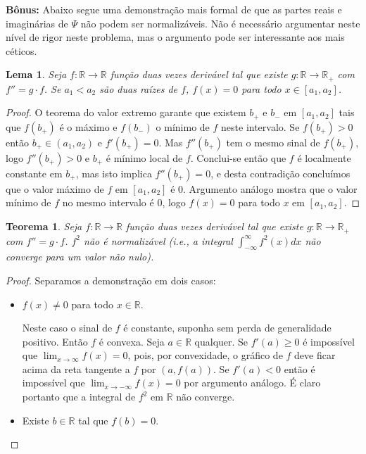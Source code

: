 \documentclass[a4paper, 12pt, notitlepage]{article}
\newtheorem{lema}{Lema }
\newtheorem{teorema}{Teorema }
\newcommand{\R}{\mathbb{R}}
\begin{document}
\begin{enumerate}
  \textbf{Bônus:} Abaixo segue uma demonstração mais formal de que as partes reais e imaginárias de $\Psi$ não podem ser normalizáveis. Não é necessário argumentar neste nível de rigor neste problema, mas o argumento pode ser interessante aos mais céticos.

  \begin{lema}\label{lema:lema1}
    Seja $f: \R \rightarrow \R$ função duas vezes derivável tal que existe $g: \R \rightarrow \R_+$ com $f'' = g\cdot f$. Se $a_1 < a_2$ são duas raízes de $f$, $f(x) = 0$ para todo $x \in [a_1, a_2]$.
  \end{lema}
  \begin{proof}
    O teorema do valor extremo garante que existem $b_+$ e $b_-$ em $[a_1, a_2]$ tais que $f(b_+)$ é o máximo e $f(b_-)$ o mínimo de $f$ neste intervalo. Se $f(b_+) > 0$ então $b_+ \in (a_1, a_2)$ e $f'(b_+) = 0$. Mas $f''(b_+)$ tem o mesmo sinal de $f(b_+)$, logo $f''(b_+) > 0$ e $b_+$ é mínimo local de $f$. Conclui-se então que $f$ é localmente constante em $b_+$, mas isto implica $f''(b_+) = 0$, e desta contradição concluímos que o valor máximo de $f$ em $[a_1, a_2]$ é $0$. Argumento análogo mostra que o valor mínimo de $f$ no mesmo intervalo é $0$, logo $f(x) = 0$ para todo $x$ em $[a_1, a_2]$.
  \end{proof}
  \begin{teorema}
    Seja $f: \R \rightarrow \R$ função duas vezes derivável tal que existe $g: \R \rightarrow \R_+$ com $f'' = g\cdot f$. $f^2$ não é normalizável (i.e., a integral $\int_{-\infty}^{\infty} f^2(x)dx$ não converge para um valor não nulo).
  \end{teorema}
  \begin{proof}
    Separamos a demonstração em dois casos:
    \begin{itemize}
      \item $f(x) \neq 0$ para todo $x \in \R$.
    
      Neste caso o sinal de $f$ é constante, suponha sem perda de generalidade positivo. Então $f$ é convexa. Seja $a \in \R$ qualquer. Se $f'(a) \ge 0$ é impossível que $\lim_{x \to \infty} f(x) = 0$, pois, por convexidade, o gráfico de $f$ deve ficar acima da reta tangente a $f$ por $(a, f(a))$. Se $f'(a) < 0$ então é impossível que $\lim_{x \to -\infty} f(x) = 0$ por argumento análogo. É claro portanto que a integral de $f^2$ em $\R$ não converge.
    
      \item Existe $b \in \R$ tal que $f(b) = 0$.
    

\end{itemize}
\end{proof}
\end{enumerate}
\end{document}
